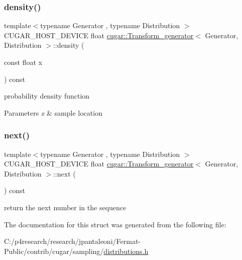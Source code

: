 \subsubsection{\texorpdfstring{density()}{density()}}
{\footnotesize\ttfamily template$<$typename Generator , typename Distribution $>$ \\
C\+U\+G\+A\+R\+\_\+\+H\+O\+S\+T\+\_\+\+D\+E\+V\+I\+CE float \hyperlink{structcugar_1_1_transform__generator}{cugar\+::\+Transform\+\_\+generator}$<$ Generator, Distribution $>$\+::density (\begin{DoxyParamCaption}\item[{const float}]{x }\end{DoxyParamCaption}) const\hspace{0.3cm}{\ttfamily [inline]}}

probability density function


\begin{DoxyParams}{Parameters}
{\em x} & sample location \\
\hline
\end{DoxyParams}
\mbox{\label{structcugar_1_1_transform__generator_af61d4278e069e046a62a58c7d538ac22}} 
\subsubsection{\texorpdfstring{next()}{next()}}
{\footnotesize\ttfamily template$<$typename Generator , typename Distribution $>$ \\
C\+U\+G\+A\+R\+\_\+\+H\+O\+S\+T\+\_\+\+D\+E\+V\+I\+CE float \hyperlink{structcugar_1_1_transform__generator}{cugar\+::\+Transform\+\_\+generator}$<$ Generator, Distribution $>$\+::next (\begin{DoxyParamCaption}{ }\end{DoxyParamCaption}) const\hspace{0.3cm}{\ttfamily [inline]}}

return the next number in the sequence 

The documentation for this struct was generated from the following file\+:\begin{DoxyCompactItemize}
\item 
C\+:/p4research/research/jpantaleoni/\+Fermat-\/\+Public/contrib/cugar/sampling/\hyperlink{distributions_8h}{distributions.\+h}\end{DoxyCompactItemize}
